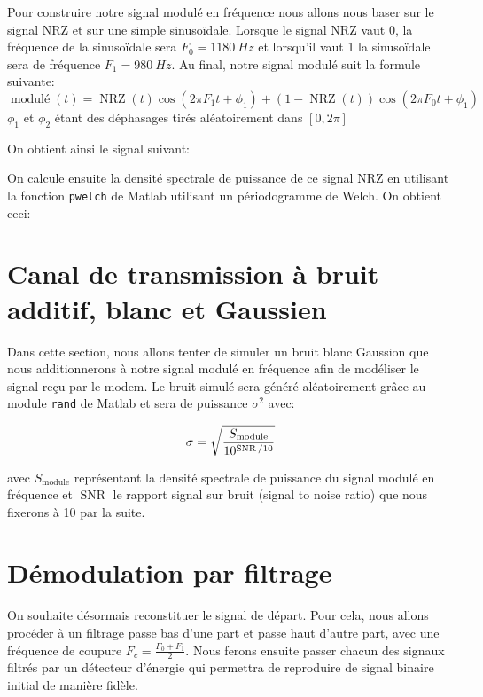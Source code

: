 \documentclass{article}
\begin{document}
Pour construire notre signal modulé en fréquence nous allons nous baser sur le signal NRZ et sur une simple sinusoïdale. Lorsque le signal NRZ vaut 0, la fréquence de la sinusoïdale sera $F_0=\SI{1180}{Hz}$ et lorsqu'il vaut 1 la sinusoïdale sera de fréquence $F_1=\SI{980}{Hz}$. Au final, notre signal modulé suit la formule suivante:
\[
\operatorname{modulé}(t)=\operatorname{NRZ}(t) \cos(2\pi F_1 t + \phi_1) + (1-\operatorname{NRZ}(t)) \cos(2 \pi F_0 t + \phi_1)
\]
$\phi_1$ et $\phi_2$ étant des déphasages tirés aléatoirement dans $[0, 2\pi]$

On obtient ainsi le signal suivant:



On calcule ensuite la densité spectrale de puissance de ce signal NRZ en utilisant la fonction \verb|pwelch| de Matlab utilisant un périodogramme de Welch. 
On obtient ceci:




\section{Canal de transmission à bruit additif, blanc et Gaussien}

Dans cette section, nous allons tenter de simuler un bruit blanc Gaussion que nous additionnerons à notre signal modulé en fréquence afin de modéliser le signal reçu par le modem.
Le bruit simulé sera généré aléatoirement grâce au module \verb|rand| de Matlab et sera de puissance $\sigma^2$ avec:

\[
\sigma=\sqrt{\frac{S_\text{module}}{10^{\operatorname{SNR}/10}}} \huge
\]

avec $S_\text{module}$ représentant la densité spectrale de puissance du signal modulé en fréquence et $\operatorname{SNR}$ le rapport signal sur bruit (signal to noise ratio) que nous fixerons à 10 par la suite.



\section{Démodulation par filtrage}

On souhaite désormais reconstituer le signal de départ. Pour cela, nous allons procéder à un filtrage passe bas d'une part et passe haut d'autre part, avec une fréquence de coupure $F_c=\frac{F_0+F_1}{2}$. Nous ferons ensuite passer chacun des signaux filtrés par un détecteur d'énergie qui permettra de reproduire de signal binaire initial de manière fidèle.
\end{document}
